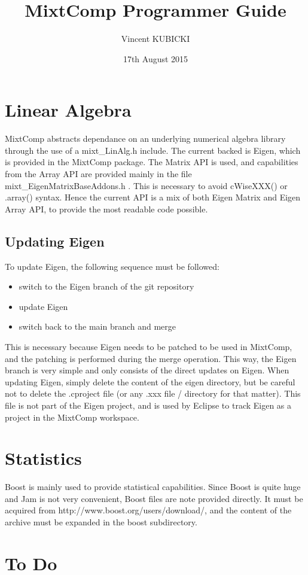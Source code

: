 \documentclass{article}
\title{MixtComp Programmer Guide}
\author{Vincent KUBICKI}
\date{17th August 2015}
\begin{document}
\maketitle

\section{Linear Algebra}

MixtComp abstracts dependance on an underlying numerical algebra library through the use of a mixt_LinAlg.h include. The current backed is Eigen, which is provided in the MixtComp package. The Matrix API is used, and capabilities from the Array API are provided mainly in the file mixt_EigenMatrixBaseAddons.h . This is necessary to avoid cWiseXXX() or .array() syntax. Hence the current API is a mix of both Eigen Matrix and Eigen Array API, to provide the most readable code possible.

\subsection{Updating Eigen}

To update Eigen, the following sequence must be followed:

\begin{itemize}
\item switch to the Eigen branch of the git repository
\item update Eigen
\item switch back to the main branch and merge
\end{itemize}

This is necessary because Eigen needs to be patched to be used in MixtComp, and the patching is performed during the merge operation. This way, the Eigen branch is very simple and only consists of the direct updates on Eigen. When updating Eigen, simply delete the content of the eigen directory, but be careful not to delete the .cproject file (or any .xxx file / directory for that matter). This file is not part of the Eigen project, and is used by Eclipse to track Eigen as a project in the MixtComp workspace.

\section{Statistics}

Boost is mainly used to provide statistical capabilities. Since Boost is quite huge and Jam is not very convenient, Boost files are note provided directly. It must be acquired from http://www.boost.org/users/download/, and the content of the archive must be expanded in the boost subdirectory.

\section{To Do}
\end{document}
